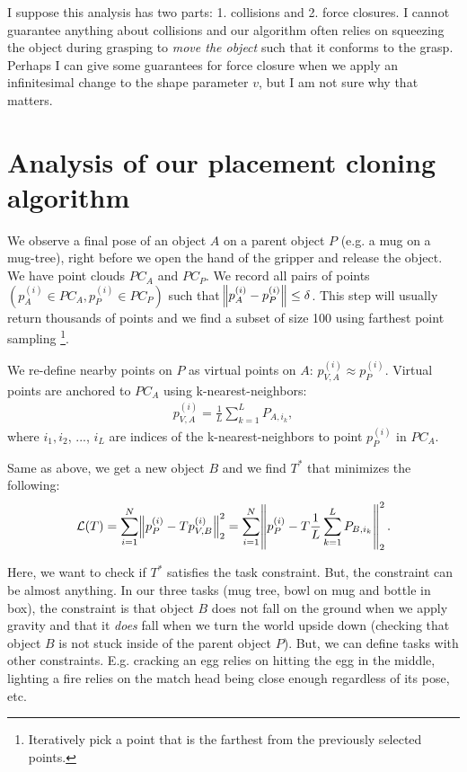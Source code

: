 \documentclass{article}
\begin{document}
I suppose this analysis has two parts: 1. collisions and 2. force closures. I cannot guarantee anything about collisions and our algorithm often relies on squeezing the object during grasping to \textit{move the object} such that it conforms to the grasp. Perhaps I can give some guarantees for force closure when we apply an infinitesimal change to the shape parameter $v$, but I am not sure why that matters.

\section{Analysis of our placement cloning algorithm}

We observe a final pose of an object $A$ on a parent object $P$ (e.g. a mug on a mug-tree), right before we open the hand of the gripper and release the object. We have point clouds $PC_A$ and $PC_P$. We record all pairs of points $(p^{(i)}_A \in PC_A, p^{(i)}_P \in PC_P)$ such that $\norm{p^{(i)}_A - p^{(i)}_P} \leq \delta$. This step will usually return thousands of points and we find a subset of size 100 using farthest point sampling \footnote{Iteratively pick a point that is the farthest from the previously selected points.}.

We re-define nearby points on $P$ as virtual points on $A$: $p^{(i)}_{V,A} \approx p^{(i)}_P$. Virtual points are anchored to $PC_A$ using k-nearest-neighbors:
\begin{align}
    p^{(i)}_{V,A} = \frac{1}{L} \sum_{k=1}^L P_{A,i_k},
\end{align}
where $i_1, i_2$, ..., $i_L$ are indices of the k-nearest-neighbors to point $p^{(i)}_P$ in $PC_A$.

Same as above, we get a new object $B$ and we find $T^*$ that minimizes the following:
\begin{align}
    \mathcal{L}(T) = \sum_{i=1}^N \norm{ p^{(i)}_P - T p^{(i)}_{V,B} }_2^2 = \sum_{i=1}^N \norm{ p^{(i)}_P - T \frac{1}{L} \sum_{k=1}^L P_{B,i_k} }_2^2.
\end{align}

Here, we want to check if $T^*$ satisfies the task constraint. But, the constraint can be almost anything. In our three tasks (mug tree, bowl on mug and bottle in box), the constraint is that object $B$ does not fall on the ground when we apply gravity and that it \textit{does} fall when we turn the world upside down (checking that object $B$ is not stuck inside of the parent object $P$). But, we can define tasks with other constraints. E.g. cracking an egg relies on hitting the egg in the middle, lighting a fire relies on the match head being close enough regardless of its pose, etc.
\end{document}
